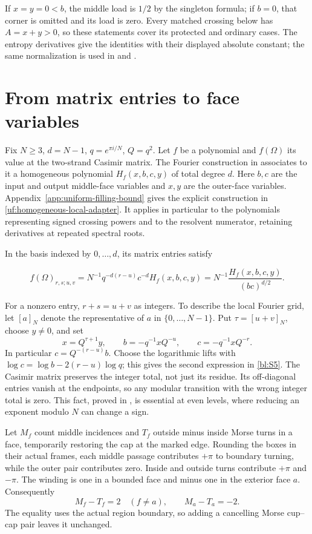 If $x=y=0<b$, the middle load is $1/2$ by the singleton formula;
if $b=0$, that corner is omitted and its load is zero. Every matched
crossing below has $A=x+y>0$, so these statements cover its protected
and ordinary cases. The entropy derivatives give the identities with
their displayed absolute constant; the same normalization is used in
\cite[Section~5]{CasimirSources} and \cite[Section~1]{MarkedFillings}.

\section{From matrix entries to face variables}
\label{morse:face-adapter}

Fix \(N\ge3\), \(d=N-1\), \(q=e^{\pi i/N}\), \(Q=q^2\). Let $f$ be a polynomial and $f(\Omega)$ its value at the two-strand
Casimir matrix. The Fourier construction in
\cite[equation (4.5)]{Finite} associates to it a homogeneous polynomial
$H_f(x,b,c,y)$ of total degree $d$. Here $b,c$ are the input and
output middle-face variables and $x,y$ are the outer-face variables.
Appendix~\ref{app:uniform-filling-bound} gives the explicit construction
in \eqref{uf:homogeneous-local-adapter}. It applies in particular to
the polynomials representing signed crossing powers and to the
resolvent numerator, retaining derivatives at repeated spectral roots.

In the basis indexed by $0,\ldots,d$, its matrix entries satisfy

\begin{equation}\label{bl:S5}
f(\Omega)_{r,s;u,v}
 =N^{-1}q^{-d(r-u)}c^{-d}H_f(x,b,c,y)
 =N^{-1}\frac{H_f(x,b,c,y)}{(bc)^{d/2}} .
\end{equation}

For a nonzero entry, $r+s=u+v$ as integers. To describe the local
Fourier grid, let $[a]_N$ denote the representative of $a$ in
$\{0,\ldots,N-1\}$. Put $\tau=[u+v]_N$, choose $y\ne0$, and set
\[
 x=Q^{\tau+1}y,\qquad
 b=-q^{-1}xQ^{-u},\qquad c=-q^{-1}xQ^{-r}.
\]
In particular $c=Q^{-(r-u)}b$. Choose the logarithmic lifts with
$\log c=\log b-2(r-u)\log q$; this gives the second expression in
\eqref{bl:S5}. The Casimir matrix preserves the integer total, not
just its residue. Its off-diagonal entries vanish at the endpoints,
so any modular transition with the wrong integer total is zero.
This fact, proved in \cite[Section 4]{Finite}, is essential at even
levels, where reducing an exponent modulo $N$ can change a sign.

Let \(M_f\) count middle incidences and \(T_f\) outside minus
inside Morse turns in a face, temporarily restoring the cap at the
marked edge. Rounding the boxes in their actual frames, each middle
passage contributes \(+\pi\) to boundary turning, while the outer pair
contributes zero. Inside and outside turns contribute \(+\pi\) and
\(-\pi\). The winding is one in a bounded face and minus one in the
exterior face \(a\). Consequently
\begin{equation}\label{bl:S8}
 M_f-T_f=2\quad(f\ne a),\qquad M_a-T_a=-2.
\end{equation}
The equality uses the actual region boundary, so adding a cancelling
Morse cup--cap pair leaves it unchanged.

